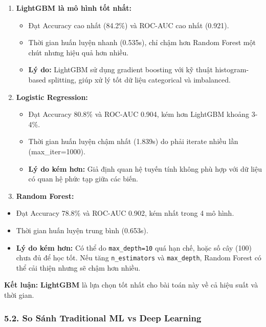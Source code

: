 \documentclass[
]{article}
\providecommand{\tightlist}{%
  \setlength{\itemsep}{0pt}\setlength{\parskip}{0pt}}
\begin{document}
\begin{enumerate}
\def\labelenumi{\arabic{enumi}.}
\item
  \textbf{LightGBM là mô hình tốt nhất:}

  \begin{itemize}
  \tightlist
  \item
    Đạt Accuracy cao nhất (84.2\%) và ROC-AUC cao nhất (0.921).
  \item
    Thời gian huấn luyện nhanh (0.535s), chỉ chậm hơn Random Forest một
    chút nhưng hiệu quả hơn nhiều.
  \item
    \textbf{Lý do:} LightGBM sử dụng gradient boosting với kỹ thuật
    histogram-based splitting, giúp xử lý tốt dữ liệu categorical và
    imbalanced.
  \end{itemize}
\item
  \textbf{Logistic Regression:}

  \begin{itemize}
  \tightlist
  \item
    Đạt Accuracy 80.8\% và ROC-AUC 0.904, kém hơn LightGBM khoảng 3-4\%.
  \item
    Thời gian huấn luyện chậm nhất (1.839s) do phải iterate nhiều lần
    (max\_iter=1000).
  \item
    \textbf{Lý do kém hơn:} Giả định quan hệ tuyến tính không phù hợp
    với dữ liệu có quan hệ phức tạp giữa các biến.
  \end{itemize}
\item
  \textbf{Random Forest:}
\end{enumerate}

\begin{itemize}
\tightlist
\item
  Đạt Accuracy 78.8\% và ROC-AUC 0.902, kém nhất trong 4 mô hình.
\item
  Thời gian huấn luyện trung bình (0.653s).
\item
  \textbf{Lý do kém hơn:} Có thể do \texttt{max\_depth=10} quá hạn chế,
  hoặc số cây (100) chưa đủ để học tốt. Nếu tăng \texttt{n\_estimators}
  và \texttt{max\_depth}, Random Forest có thể cải thiện nhưng sẽ chậm
  hơn nhiều.
\end{itemize}

\textbf{Kết luận:} \textbf{LightGBM} là lựa chọn tốt nhất cho bài toán
này về cả hiệu suất và thời gian.

\subsubsection{5.2. So Sánh Traditional ML vs Deep
Learning}\label{52-so-suxe1nh-traditional-ml-vs-deep-learning}
\end{document}
